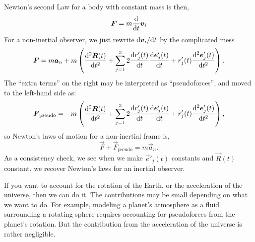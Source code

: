 Newton's second Law for a body with constant mass is then,
\begin{equation}
\boldsymbol{F} = m\frac{\mathrm{d}}{\mathrm{d} t}\boldsymbol{v}_{i}
\end{equation}
For a non-inertial observer, we just rewrite $\mathrm{d}\boldsymbol{v}_{i}/\mathrm{d} t$ by the
complicated mess
\begin{equation}
\boldsymbol{F} = m\boldsymbol{a}_{n} + m\left(\frac{\mathrm{d}^{2}\boldsymbol{R}(t)}{\mathrm{d} t^{2}} + \sum^{3}_{j=1}2\frac{\mathrm{d} r'_{j}(t)}{\mathrm{d} t}\frac{\mathrm{d}\boldsymbol{e}'_{j}(t)}{\mathrm{d} t} +r'_{j}(t)\frac{\mathrm{d}^{2}\boldsymbol{e}'_{j}(t)}{\mathrm{d} t^{2}}\right).
\end{equation}
The ``extra terms'' on the right may be interpreted as ``pseudoforces'',
and moved to the left-hand side as:
\begin{equation}
\boldsymbol{F}_{\text{pseudo}} = -m\left(\frac{\mathrm{d}^{2}\boldsymbol{R}(t)}{\mathrm{d} t^{2}} + \sum^{3}_{j=1}2\frac{\mathrm{d} r'_{j}(t)}{\mathrm{d} t}\frac{\mathrm{d}\boldsymbol{e}'_{j}(t)}{\mathrm{d} t} +r'_{j}(t)\frac{\mathrm{d}^{2}\boldsymbol{e}'_{j}(t)}{\mathrm{d} t^{2}}\right),
\end{equation}
so Newton's laws of motion for a non-inertial frame is,
\begin{equation}
\vec{F} + \vec{F}_{\text{pseudo}} = m\vec{a}_{n}.
\end{equation}
As a consistency check, we see when we make $\vec{e}'_{j}(t)$ constants
and $\vec{R}(t)$ constant, we recover Newton's laws for an inertial observer.

If you want to account for the rotation of the Earth, or the
acceleration of the universe, then we can do it. The contributions may
be small depending on what we want to do. For example, modeling a
planet's atmosphere as a fluid surrounding a rotating sphere requires
accounting for pseudoforces from the planet's rotation. But the
contribution from the acceleration of the universe is rather negligible.
